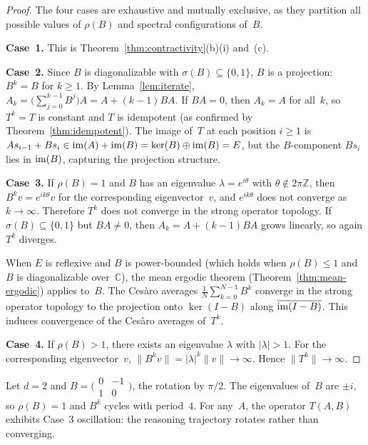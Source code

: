 \begin{proof}
  The four cases are exhaustive and mutually exclusive, as they partition all
  possible values of $\rho(B)$ and spectral configurations of~$B$.

  \textbf{Case~1.} This is Theorem~\ref{thm:contractivity}(b)(i) and~(c).

  \textbf{Case~2.} Since $B$ is diagonalizable with
  $\sigma(B)\subseteq\{0,1\}$, $B$ is a projection: $B^k=B$ for $k\geq 1$.
  By Lemma~\ref{lem:iterate}, $A_k=\bigl(\sum_{j=0}^{k-1}B^j\bigr)A =
  A+(k-1)BA$. If $BA=0$, then $A_k=A$ for all~$k$, so $T^k=T$ is constant
  and $T$ is idempotent (as confirmed by Theorem~\ref{thm:idempotent}).
  The image of~$T$ at each position $i\geq 1$ is
  $As_{i-1}+Bs_i\in\operatorname{im}(A)+\operatorname{im}(B)=\ker(B)\oplus\operatorname{im}(B)=E$,
  but the $B$-component $Bs_i$ lies in $\operatorname{im}(B)$, capturing the projection
  structure.

  \textbf{Case~3.} If $\rho(B)=1$ and $B$ has an eigenvalue
  $\lambda=e^{i\theta}$ with $\theta\notin 2\pi\mathbb{Z}$, then $B^k v=
  e^{ik\theta}v$ for the corresponding eigenvector~$v$, and $e^{ik\theta}$
  does not converge as $k\to\infty$. Therefore $T^k$ does not converge in
  the strong operator topology. If $\sigma(B)\subseteq\{0,1\}$ but $BA\neq 0$,
  then $A_k=A+(k-1)BA$ grows linearly, so again $T^k$ diverges.

  When $E$ is reflexive and $B$ is power-bounded (which holds when
  $\rho(B)\leq 1$ and $B$ is diagonalizable over~$\mathbb{C}$), the mean
  ergodic theorem (Theorem~\ref{thm:mean-ergodic}) applies to~$B$. The
  Ces\`aro averages $\frac{1}{N}\sum_{k=0}^{N-1}B^k$ converge in the strong
  operator topology to the projection onto $\ker(I-B)$ along
  $\overline{\operatorname{im}(I-B)}$. This induces convergence of the Ces\`aro averages
  of~$T^k$.

  \textbf{Case~4.} If $\rho(B)>1$, there exists an eigenvalue $\lambda$ with
  $|\lambda|>1$. For the corresponding eigenvector~$v$, $\|B^k v\|=
  |\lambda|^k\|v\|\to\infty$. Hence $\|T^k\|\to\infty$.
\end{proof}

\begin{example}\label{ex:oscillation}
  Let $d=2$ and $B=\bigl(\begin{smallmatrix}0&-1\\1&0\end{smallmatrix}\bigr)$,
  the rotation by $\pi/2$. The eigenvalues of~$B$ are $\pm i$, so $\rho(B)=1$
  and $B^k$ cycles with period~$4$. For any~$A$, the operator $T(A,B)$
  exhibits Case~3 oscillation: the reasoning trajectory rotates rather than
  converging.
\end{example}

